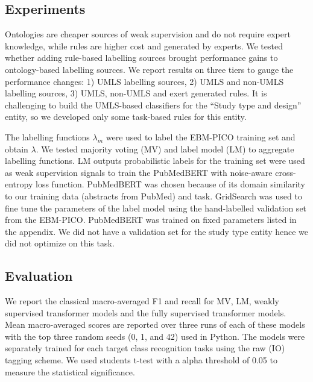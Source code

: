\documentclass[10.7pt,]{article}
\begin{document}
\subsection{Experiments}\label{transformers}
%
Ontologies are cheaper sources of weak supervision and do not require expert knowledge, while rules are higher cost and generated by experts.
We tested whether adding rule-based labelling sources brought performance gains to ontology-based labelling sources.
We report results on three tiers to gauge the performance changes: 1) UMLS labelling sources, 2) UMLS and non-UMLS labelling sources, 3) UMLS, non-UMLS and exert generated rules. 
It is challenging to build the UMLS-based classifiers for the ``Study type and design'' entity, so we developed only some task-based rules for this entity.


The labelling functions $\lambda_{m}$ were used to label the EBM-PICO training set and obtain $\lambda$. 
We tested majority voting (MV) and label model (LM) to aggregate labelling functions.
LM outputs probabilistic labels for the training set were used as weak supervision signals to train the PubMedBERT with noise-aware cross-entropy loss function.
PubMedBERT was chosen because of its domain similarity to our training data (abstracts from PubMed) and task.
GridSearch was used to fine tune the parameters of the label model using the hand-labelled validation set from the EBM-PICO. %
PubMedBERT was trained on fixed parameters listed in the appendix. %
We did not have a validation set for the study type entity hence we did not optimize on this task.
%
%
%
\subsection{Evaluation}\label{eval}
%
We report the classical macro-averaged F1 and recall for MV, LM, weakly supervised transformer models and the fully supervised transformer models.
Mean macro-averaged scores are reported over three runs of each of these models with the top three random seeds (0, 1, and 42) used in Python.
The models were separately trained for each target class recognition tasks using the raw (IO) tagging scheme.
We used students t-test with a alpha threshold of 0.05 to measure the statistical significance.
%
%
%
\end{document}
